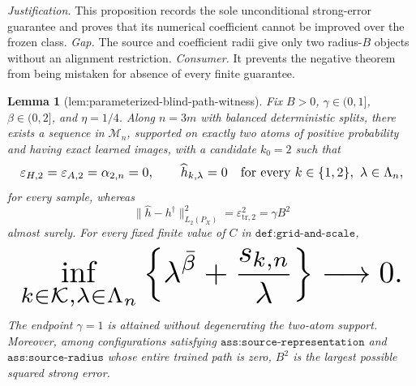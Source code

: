 \documentclass{article}
\newtheorem{lemma}{Lemma}
\begin{document}
\par\smallskip\noindent \textit{Justification.} This proposition records the sole unconditional strong-error guarantee and proves that its numerical coefficient cannot be improved over the frozen class. \textit{Gap.} The source and coefficient radii give only two radius-\(B\) objects without an alignment restriction. \textit{Consumer.} It prevents the negative theorem from being mistaken for absence of every finite guarantee.

\begin{lemma}[lem:parameterized-blind-path-witness]\label{lem:parameterized-blind-path-witness}
Fix \(B>0\), \(\gamma\in(0,1]\), \(\beta\in(0,2]\), and \(\eta=1/4\). Along \(n=3m\) with balanced deterministic splits, there exists a sequence in \(\mathcal M_n\), supported on exactly two atoms of positive probability and having exact learned images, with a candidate \(k_0=2\) such that
\[
\makebox[\linewidth][c]{\resizebox{0.98\linewidth}{!}{\(\displaystyle \varepsilon_{H,2}=\varepsilon_{A,2}=\alpha_{2,n}=0,
 \qquad
 \widehat h_{k,\lambda}=0
 \quad\text{for every }k\in\{1,2\},\ \lambda\in\Lambda_n,\)}}
\]
for every sample, whereas
\[
 \|\widehat h-h^\dagger\|_{L_2(P_X)}^2
 =\varepsilon_{\mathrm{tr},2}^2
 =\gamma B^2
\]
almost surely. For every fixed finite value of \(C\) in \(\texttt{def:grid-and-scale}\),
\[
\makebox[\linewidth][c]{\resizebox{0.98\linewidth}{!}{\(\displaystyle \inf_{k\in\mathcal K,\lambda\in\Lambda_n}
 \left\{\lambda^{\bar\beta}+\frac{s_{k,n}}{\lambda}\right\}
 \longrightarrow0.\)}}
\]
The endpoint \(\gamma=1\) is attained without degenerating the two-atom support. Moreover, among configurations satisfying \(\texttt{ass:source-representation}\) and \(\texttt{ass:source-radius}\) whose entire trained path is zero, \(B^2\) is the largest possible squared strong error.
\end{lemma}
\end{document}
